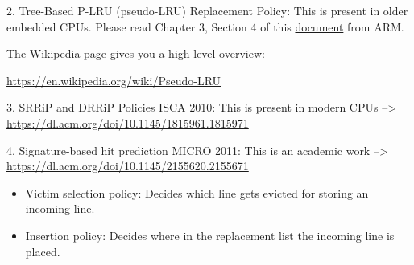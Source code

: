 \documentclass[letterpaper,12pt]{article}
\begin{document}
2. Tree-Based P-LRU (pseudo-LRU) Replacement Policy: This is present in older embedded CPUs.
Please read Chapter 3, Section 4 of this
\hyperlink{https://citeseerx.ist.psu.edu/viewdoc/download?doi=10.1.1.217.3594&rep=rep1&type=pdf}{document}
from ARM.

The Wikipedia page gives you a high-level overview:

\url{https://en.wikipedia.org/wiki/Pseudo-LRU}

3. SRRiP and DRRiP Policies  ISCA 2010: This is present in modern CPUs --> \url{https://dl.acm.org/doi/10.1145/1815961.1815971}

4. Signature-based hit prediction  MICRO 2011: This is an academic work --> \url{https://dl.acm.org/doi/10.1145/2155620.2155671}

\begin{itemize}
    \item Victim selection policy: Decides which line gets evicted for storing an incoming line.
    \item Insertion policy: Decides where in the replacement list the incoming line is placed.
\end{itemize}
\end{document}
